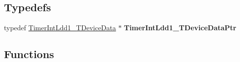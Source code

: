 \subsection*{Typedefs}
\begin{DoxyCompactItemize}
\item 
\mbox{\label{group___timer_int_ldd1__module_ga24d5bad052ceefb0ed97378c80c8dc03}} 
typedef \hyperlink{struct_timer_int_ldd1___t_device_data}{Timer\+Int\+Ldd1\+\_\+\+T\+Device\+Data} $\ast$ {\bfseries Timer\+Int\+Ldd1\+\_\+\+T\+Device\+Data\+Ptr}
\end{DoxyCompactItemize}
\subsection*{Functions}
